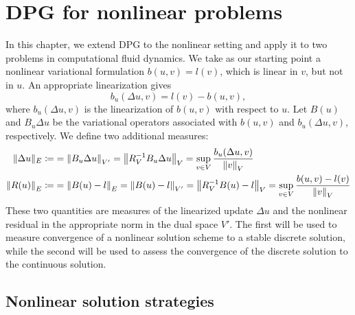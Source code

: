 \section{DPG for nonlinear problems}

In this chapter, we extend DPG to the nonlinear setting and apply it to two problems in computational fluid dynamics.  We take as our starting point a nonlinear variational formulation
$b(u,v) = l(v)$, which is linear in $v$, but not in $u$.  An appropriate linearization gives
\[
b_u(\Delta u,v) = l(v) - b(u,v),
\]
where $b_u(\Delta u,v)$ is the linearization of $b(u,v)$ with respect to $u$.  Let $B(u)$ and $B_u\Delta u$ be the variational operators associated with $b(u,v)$ and $b_u(\Delta u,v)$, respectively.  We define two additional measures: 
\begin{align*}
\|\Delta u\|_E \coloneqq &= \nor{B_u\Delta u}_{V'} = \nor{R_V^{-1} B_u\Delta u}_V = \sup_{v\in V} \frac{b_u(\Delta u,v)}{\nor{v}_V}\\
\nor{R(u)}_E \coloneqq &= \nor{B(u)-l}_E = \nor{B(u) - l}_{V'}  = \nor{R_V^{-1} B(u)-l}_V = \sup_{v\in V} \frac{b(u,v)-l(v)}{\nor{v}_V}
\end{align*}
These two quantities are measures of the linearized update $\Delta u$ and the nonlinear residual in the appropriate norm in the dual space $V'$.  The first will be used to measure convergence of a nonlinear solution scheme to a stable discrete solution, while the second will be used to assess the convergence of the discrete solution to the continuous solution.  

\subsection{Nonlinear solution strategies}

